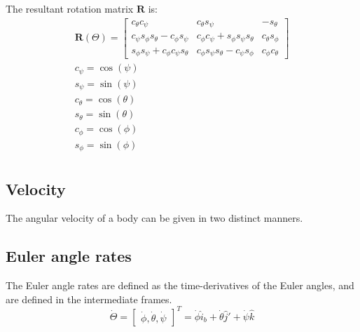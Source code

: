 The resultant rotation matrix \( \mathbf{R} \) is:
\begin{equation}
    \begin{aligned}
        \mathbf{R}(\Theta) =
        \begin{bmatrix}
            c_\theta c_\psi                        & c_\theta s_\psi                        & -s_\theta       \\
            c_\psi s_\phi s_\theta - c_\phi s_\psi & c_\phi c_\psi + s_\phi s_\psi s_\theta & c_\theta s_\phi \\
            s_\phi s_\psi + c_\phi c_\psi s_\theta & c_\phi s_\psi s_\theta - c_\psi s_\phi & c_\phi c_\theta
        \end{bmatrix} \\
        c_\psi = \cos(\psi)                                                                               \\
        s_\psi = \sin(\psi)                                                                               \\
        c_\theta = \cos(\theta)                                                                           \\
        s_\theta = \sin(\theta)                                                                           \\
        c_\phi = \cos(\phi)                                                                               \\
        s_\phi = \sin(\phi)                                                                               \\
    \end{aligned}
\end{equation}

\subsection{Velocity}
The angular velocity of a body can be given in two distinct manners.
\subsection{Euler angle rates}
The Euler angle rates are defined as the time-derivatives of the Euler angles, and are defined in the intermediate frames.
\begin{equation} \nonumber
    \dot{\Theta} = \begin{bmatrix}
        \dot{\phi}, \dot{\theta}, \dot{\psi}
    \end{bmatrix}^T
    = \dot{\phi} \hat{i}_b + \dot{\theta} \hat{j}' + \dot{\psi} \hat{k}
\end{equation}


